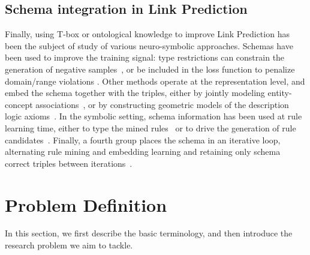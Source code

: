 \documentclass[a4paper,UKenglish,cleveref, autoref, thm-restate]{tgdk-v2021}
\begin{document}
\subsection{Schema integration in Link Prediction}
Finally, using T-box or ontological knowledge to improve Link Prediction has been the subject of study of various neuro-symbolic approaches.
Schemas have been used to improve the training signal: type restrictions can constrain the generation of negative samples~\cite{jain_improving_2021,krompas_type-constrained_2015}, or be included in the loss function to penalize domain/range violations \cite{hubert_treat_2024}. Other methods operate at the representation level, and embed the schema together with the triples, either by jointly modeling entity-concept associations~\cite{hao_universal_2019}, or by constructing geometric models of the description logic axioms~\cite{kulmanov_embeddings_2019}. In the symbolic setting, schema information has been used at rule learning time, either to type the mined rules~\cite{wu_learning_2022} or to drive the generation of rule candidates~\cite{pirro_relatedness_2020}. Finally, a fourth group places the schema in an iterative loop, alternating rule mining and embedding learning and retaining only schema correct triples between iterations~\cite{wiharja_schema_2020,zhang_iteratively_2019}.







\section{Problem Definition}
In this section, we first describe the basic terminology, and then introduce the research problem we aim to tackle.
\end{document}
